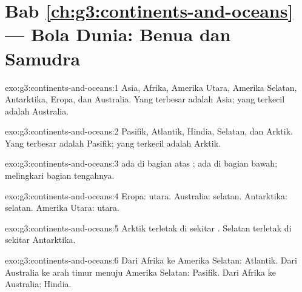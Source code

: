 \section*{Bab \ref{ch:g3:continents-and-oceans} --- Bola Dunia: Benua dan Samudra}

\begin{solution}{exo:g3:continents-and-oceans:1}
Asia, Afrika, Amerika Utara, Amerika Selatan, Antarktika, Eropa, dan
Australia. Yang terbesar adalah Asia; yang terkecil adalah Australia.
\end{solution}

\begin{solution}{exo:g3:continents-and-oceans:2}
 Pasifik, Atlantik, Hindia, Selatan, dan Arktik. Yang terbesar
adalah  Pasifik; yang terkecil adalah  Arktik.
\end{solution}

\begin{solution}{exo:g3:continents-and-oceans:3}
 ada di bagian atas ;  ada di bagian
bawah;  melingkari bagian tengahnya.
\end{solution}

\begin{solution}{exo:g3:continents-and-oceans:4}
Eropa: utara. Australia: selatan. Antarktika: selatan. Amerika Utara:
utara.
\end{solution}

\begin{solution}{exo:g3:continents-and-oceans:5}
 Arktik terletak di sekitar .  Selatan terletak di
sekitar Antarktika.
\end{solution}

\begin{solution}{exo:g3:continents-and-oceans:6}
Dari Afrika ke Amerika Selatan:  Atlantik. Dari Australia ke arah
timur menuju Amerika Selatan:  Pasifik. Dari Afrika ke Australia:
 Hindia.
\end{solution}

